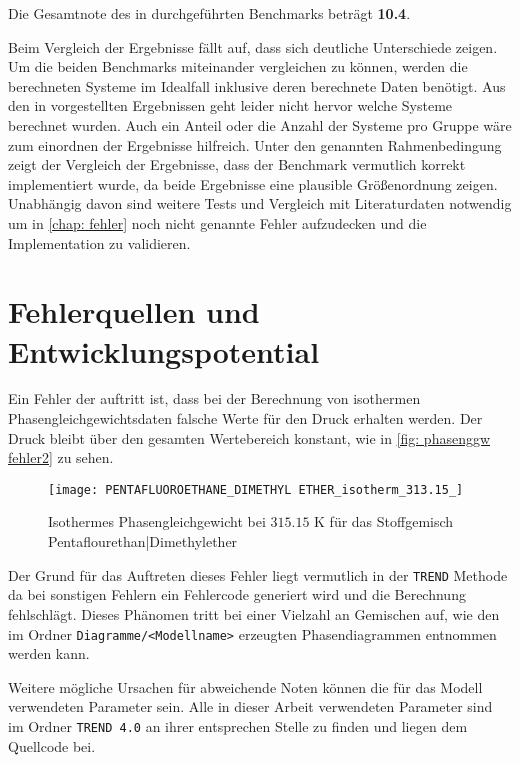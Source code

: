 \documentclass[../thesis.tex]{subfiles}
\begin{document}
Die Gesamtnote des in \cite{moine2021} durchgeführten Benchmarks beträgt \textbf{10.4}.

Beim Vergleich der Ergebnisse fällt auf, dass sich deutliche Unterschiede zeigen. Um die beiden Benchmarks miteinander vergleichen zu können, werden die berechneten Systeme im Idealfall inklusive deren berechnete Daten benötigt. Aus den in \cite{moine2021} vorgestellten Ergebnissen geht leider nicht hervor welche Systeme berechnet wurden. Auch ein Anteil oder die Anzahl der Systeme pro Gruppe wäre zum einordnen der Ergebnisse hilfreich. Unter den genannten Rahmenbedingung zeigt der Vergleich der Ergebnisse, dass der Benchmark vermutlich korrekt implementiert wurde, da beide Ergebnisse eine plausible Größenordnung zeigen. Unabhängig davon sind weitere Tests und Vergleich mit Literaturdaten notwendig um in \autoref{chap: fehler} noch nicht genannte Fehler aufzudecken und die Implementation zu validieren.


\chapter{Fehlerquellen und Entwicklungspotential}
\label{chap: fehler}

Ein Fehler der auftritt ist, dass bei der Berechnung von isothermen Phasengleichgewichtsdaten falsche Werte für den Druck erhalten werden. Der Druck bleibt über den gesamten Wertebereich konstant, wie in \autoref{fig: phasenggw fehler2} zu sehen.

\begin{figure}[htb]
	\centering
	\texttt{[image: PENTAFLUOROETHANE\_DIMETHYL ETHER\_isotherm\_313.15\_]}
	\caption{Isothermes Phasengleichgewicht bei $ 315$.$15$ K für das Stoffgemisch Pentaflourethan|Dimethylether}
	\label{fig: phasenggw fehler2}
\end{figure}
Der Grund für das Auftreten dieses Fehler liegt vermutlich in der \texttt{TREND} Methode da bei sonstigen Fehlern ein Fehlercode generiert wird und die Berechnung fehlschlägt. Dieses Phänomen tritt bei einer Vielzahl an Gemischen auf, wie den im Ordner \texttt{Diagramme/<Modellname>} erzeugten Phasendiagrammen  entnommen werden kann.

Weitere mögliche Ursachen für abweichende Noten können die für das Modell verwendeten Parameter sein. Alle in dieser Arbeit verwendeten Parameter sind im Ordner \texttt{TREND 4.0} an ihrer entsprechen Stelle zu finden und liegen dem Quellcode bei.
\end{document}
